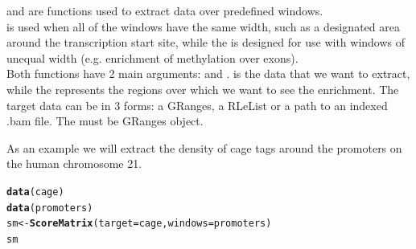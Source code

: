 \documentclass{article}\usepackage[]{graphicx}\usepackage[]{color}
\makeatletter
\newcommand{\hlstd}[1]{\textcolor[rgb]{0.345,0.345,0.345}{#1}}%
\newcommand{\hlkwb}[1]{\textcolor[rgb]{0.69,0.353,0.396}{#1}}%
\newcommand{\hlkwc}[1]{\textcolor[rgb]{0.333,0.667,0.333}{#1}}%
\newcommand{\hlkwd}[1]{\textcolor[rgb]{0.737,0.353,0.396}{\textbf{#1}}}%
\newenvironment{kframe}{%
 \def\at@end@of@kframe{}%
 \ifinner\ifhmode%
  \def\at@end@of@kframe{\end{minipage}}%
  \begin{minipage}{\columnwidth}%
 \fi\fi%
 \def\FrameCommand##1{\hskip\@totalleftmargin \hskip-\fboxsep
 \colorbox{shadecolor}{##1}\hskip-\fboxsep
     \hskip-\linewidth \hskip-\@totalleftmargin \hskip\columnwidth}%
 \MakeFramed {\advance\hsize-\width
   \@totalleftmargin\z@ \linewidth\hsize
   \@setminipage}}%
 {\par\unskip\endMakeFramed%
 \at@end@of@kframe}
\newenvironment{knitrout}{}{} %
\makeatother
\begin{document}
 and  are functions used to extract 
data over predefined windows.
\\
 is used when all of the windows
have the same width, such as a designated area around the transcription start site, while the
 is designed for use with windows of unequal width 
(e.g. enrichment of methylation over exons).
\\
Both functions have 2 main arguments:  and 
.  is the data that we want to extract, while the 
represents the regions over which we want to see the enrichment. The target data
can be in 3 forms: a GRanges, a RLeList or a path to an indexed .bam file.
The  must be GRanges object.

As an example we will extract the density of cage tags around the promoters on 
the human chromosome 21.
\begin{knitrout}
\color{fgcolor}\begin{kframe}
\begin{alltt}
\hlkwd{data}\hlstd{(cage)}
\hlkwd{data}\hlstd{(promoters)}
\hlstd{sm} \hlkwb{<-} \hlkwd{ScoreMatrix}\hlstd{(}\hlkwc{target} \hlstd{= cage,} \hlkwc{windows} \hlstd{= promoters)}
\hlstd{sm}
\end{alltt}


{\ttfamily\noindent\itshape\color{messagecolor}{\#\#\ \  scoreMatrix with dims: 1055 2001}}\end{kframe}
\end{knitrout}
\end{document}
